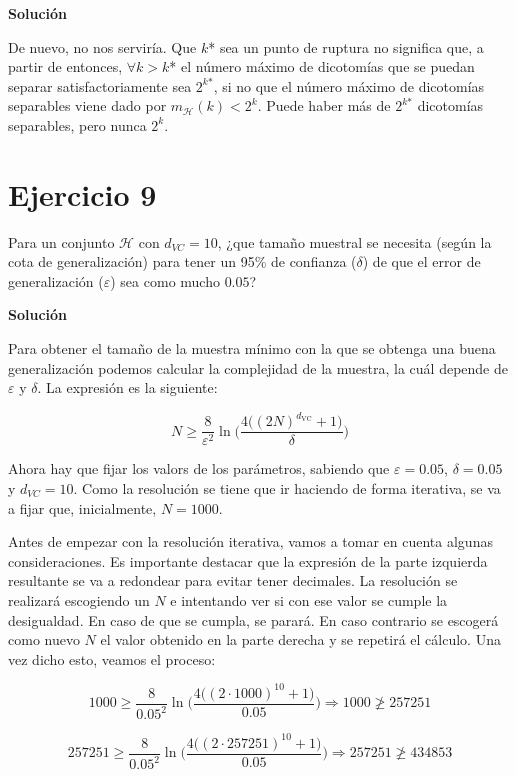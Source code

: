 \documentclass[11pt,a4paper]{article}
\newcommand{\answer}{\noindent\textbf{Solución}}
\newcommand{\addtoc}[1]{\addcontentsline{toc}{section}{#1}}
\begin{document}
\answer

De nuevo, no nos serviría. Que $k$* sea un punto de ruptura no significa que, a partir de entonces, $\forall k > k$* 
el número máximo de dicotomías que se puedan separar satisfactoriamente sea $2^{k\text{*}}$, si no que el número máximo de
dicotomías separables viene dado por $m_\mathcal{H}(k) < 2^k$. Puede haber más de $2^{k\text{*}}$ dicotomías separables,
pero nunca $2^k$.

\section*{Ejercicio 9}
\addtoc{Ejercicio 9}

\noindent Para un conjunto $\mathcal{H}$ con $d_{VC} = 10$, ¿que tamaño muestral se necesita (según la cota de generalización)
para tener un 95\% de confianza ($\delta$) de que el error de generalización ($\varepsilon$) sea como mucho $0.05$?

\answer

Para obtener el tamaño de la muestra mínimo con la que se obtenga una buena generalización podemos calcular la complejidad
de la muestra, la cuál depende de $\varepsilon$ y $\delta$. La expresión es la siguiente:

\begin{equation}
\label{eq:sample_complexity}
	N \geq \frac{8}{\varepsilon^2} \ln \Bigg( \frac{4 \big( (2N)^{d_{\text{VC}}} + 1 \big)}{\delta} \Bigg)
\end{equation}

Ahora hay que fijar los valors de los parámetros, sabiendo que $\varepsilon = 0.05$, $\delta = 0.05$ y $d_{VC} = 10$. 
Como la resolución se tiene que ir haciendo de forma iterativa, se va a fijar que, inicialmente, $N = 1000$.

Antes de empezar con la resolución iterativa, vamos a tomar en cuenta algunas consideraciones.
Es importante destacar que la expresión de la parte izquierda resultante se va a redondear para evitar tener decimales. La
resolución se realizará escogiendo un $N$ e intentando ver si con ese valor se cumple la desigualdad. En caso de que se
cumpla, se parará. En caso contrario se escogerá como nuevo $N$ el valor obtenido en la parte derecha y se repetirá el cálculo.
Una vez dicho esto, veamos el proceso:

\[ 1000 \geq \frac{8}{0.05^2} \ln \Bigg( \frac{4 \big( (2 \cdot 1000)^{10} + 1 \big)}{0.05} \Bigg)
\Rightarrow 1000 \ngeq 257251 \]

\[ 257251 \geq \frac{8}{0.05^2} \ln \Bigg( \frac{4 \big( (2 \cdot 257251)^{10} + 1 \big)}{0.05} \Bigg)
\Rightarrow 257251 \ngeq 434853 \]
\end{document}

